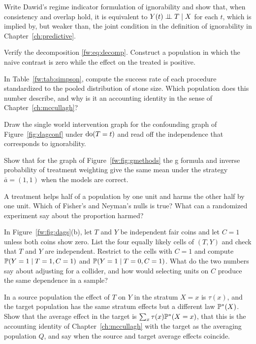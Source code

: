 \begin{exercises}
\item\label{ex:ch01:5} Write Dawid's regime indicator formulation of ignorability and show that, when consistency and overlap hold, it is equivalent to $Y(t) \perp\!\!\!\perp T \mid X$ for each $t$, which is implied by, but weaker than, the joint condition in the definition of ignorability in Chapter~\ref{ch:predictive}.
\item\label{ex:chframeworks:1} Verify the decomposition \eqref{fw:eq:decomp}. Construct a population in which the naive contrast is zero while the effect on the treated is positive.
\item\label{ex:chframeworks:2} In Table~\ref{fw:tab:simpson}, compute the success rate of each procedure standardized to the pooled distribution of stone size. Which population does this number describe, and why is it an accounting identity in the sense of Chapter~\ref{ch:mccullagh}?
\item\label{ex:chframeworks:3} Draw the single world intervention graph for the confounding graph of Figure~\ref{fig:dagconf} under $\mathrm{do}(T=t)$ and read off the independence that corresponds to ignorability.
\item\label{ex:chframeworks:4} Show that for the graph of Figure~\ref{fw:fig:gmethods} the g formula and inverse probability of treatment weighting give the same mean under the strategy $\bar a=(1,1)$ when the models are correct.
\item\label{ex:chframeworks:5} A treatment helps half of a population by one unit and harms the other half by one unit. Which of Fisher's and Neyman's nulls is true? What can a randomized experiment say about the proportion harmed?
\item\label{ex:chframeworks:6} In Figure~\ref{fw:fig:dags}(b), let $T$ and $Y$ be independent fair coins and let $C=1$ unless both coins show zero. List the four equally likely cells of $(T,Y)$ and check that $T$ and $Y$ are independent. Restrict to the cells with $C=1$ and compute $\mathbb{P}(Y=1\mid T=1, C=1)$ and $\mathbb{P}(Y=1\mid T=0, C=1)$. What do the two numbers say about adjusting for a collider, and how would selecting units on $C$ produce the same dependence in a sample?
\item\label{ex:chframeworks:7} In a source population the effect of $T$ on $Y$ in the stratum $X=x$ is $\tau(x)$, and the target population has the same stratum effects but a different law $\mathbb{P}^{\ast}(X)$. Show that the average effect in the target is $\sum_x \tau(x)\mathbb{P}^{\ast}(X=x)$, that this is the accounting identity of Chapter~\ref{ch:mccullagh} with the target as the averaging population $Q$, and say when the source and target average effects coincide.

\end{exercises}
